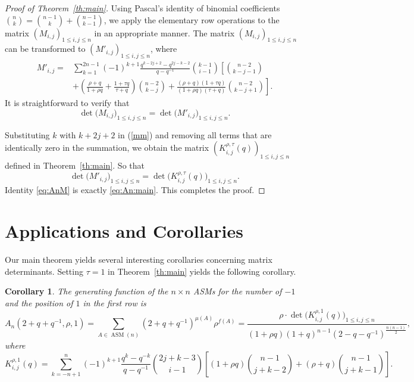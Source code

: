 \documentclass[12pt, a4paper]{amsart} %
\numberwithin{equation}{section}
\newtheorem{corollary}[theorem]{Corollary}
\DeclareMathOperator{\ASM}{ASM}
\begin{document}
\begin{proof}[Proof of Theorem~\ref{th:main}]
Using Pascal's identity of binomial coefficients
$\binom{n}{k}=\binom{n-1}{k}+\binom{n-1}{k-1}$, we apply the elementary row operations to the matrix $(M_{i,j})_{1 \le i,j \le n}$
	in an appropriate manner. The matrix $(M_{i,j})_{1\leq i, j\leq n}$ can be transformed to 
$(M'_{i,j})_{1\leq i, j\leq n}$, where
\begin{align}\label{mm}
    M'_{i,j} 
      =& \sum_{k=1}^{2n-1}(-1)^{k+1}\frac{q^{k-2j+2}-q^{2j-k-2}}{q-q^{-1}}\binom{k-1}{i-1}\left[\binom{n-2}{k-j-1} \right.\nonumber \\
      &\left. +(\frac{\rho +q}{1+\rho q}+\frac{1+\tau q}{\tau +q})\binom{n-2}{k-j}+\frac{(\rho +q)(1+\tau q)  }{(1+\rho q)(\tau +q) } \binom{n-2}{k-j+1}  \right].
\end{align}
It is straightforward to verify that 
$$\det{\bigl(M_{i,j}\bigr)_{1 \le i,j \le n}}
	=\det{\bigl(M'_{i,j}\bigr)_{1 \le i,j \le n}}.
$$


Substituting $k$ with $k+2j+2$ in (\ref{mm}) and removing all terms that are identically zero in the summation, 
we obtain the matrix $(K^{\rho,\tau}_{i,j}(q))_{1 \le i,j \le n}$ defined in Theorem~\ref{th:main}. So that
$$\det{\bigl(M'_{i,j}\bigr)_{1 \le i,j \le n}}
	=\det{\bigl(K^{\rho,\tau}_{i,j}(q)\bigr)_{1 \le i,j \le n}}.
$$
Identity \eqref{eq:AnM} is exactly \eqref{eq:An:main}.
This completes the proof. 
\end{proof}




\section{Applications and Corollaries}\label{sec:applications} %
Our main theorem yields several interesting corollaries concerning matrix determinants. 
Setting $\tau=1$ in Theorem~\ref{th:main} yields the following corollary. 

\begin{corollary}\label{cor:tau=1}
    The generating function of the $n\times n$ ASMs for the number of $-1$ and the position of $1$ in the first row is 
    \begin{equation*}
			A_n(2+q+q^{-1},\rho, 1)=\sum_{A\in \ASM(n)}(2+q+q^{-1})^{\mu(A)}\rho^{f(A)}=\frac{\rho\cdot \det{\bigl(K^{\rho,1}_{i,j}(q)\bigr)_{1 \le i,j \le n}}}{(1+\rho q)(1+q)^{n-1}(2-q-q^{-1})^{\frac{n(n-1)}{2}}},
    \end{equation*}
     where 
$$
K^{\rho,1}_{i,j}(q)
	= \sum_{k=-n+1}^n(-1)^{k+1}\frac{q^k-q^{-k}}{q-q^{-1}}{2j+k-3 \choose i-1} \left[(1+\rho q){n-1 \choose j+k-2}
	+ (\rho +q){n-1 \choose j+k-1}\right].
$$
\end{corollary}
\end{document}
